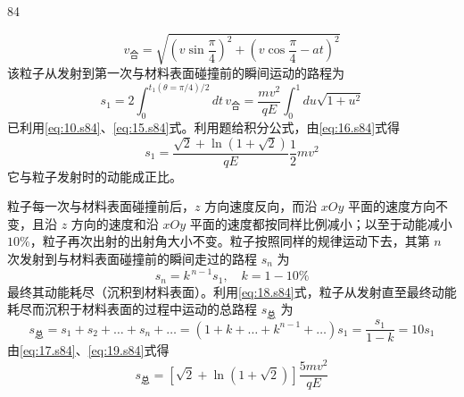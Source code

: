 \begin{solution}{84}
\begin{subsolution}
\begin{subsubsolution}
\begin{subsubsubsolution}
\begin{subsubsubsubsolution}
                    \begin{equation}
                        v_{\text{合}} = \sqrt{ (v\sin\frac{\pi}{4})^{2} + (v\cos\frac{\pi}{4} - a t)^{2} }
                        \label{eq:15.s84}
                    \end{equation}
                    该粒子从发射到第一次与材料表面碰撞前的瞬间运动的路程为
                    \begin{equation}
                        s_{1} = 2 \int_{0}^{t_{1}(\theta=\pi/4)/2} dt\, v_{\text{合}} = \frac{m v^{2}}{q E} \int_{0}^{1} du \sqrt{1+u^{2}}
                        \label{eq:16.s84}
                    \end{equation}
                    已利用\eqref{eq:10.s84}、\eqref{eq:15.s84}式。利用题给积分公式，由\eqref{eq:16.s84}式得
                    \begin{equation}
                        s_{1} = \frac{\sqrt{2} + \ln(1+\sqrt{2})}{q E} \frac{1}{2} m v^{2}
                        \label{eq:17.s84}
                    \end{equation}
                    它与粒子发射时的动能成正比。

                    粒子每一次与材料表面碰撞前后，$z$ 方向速度反向，而沿 $xOy$ 平面的速度方向不变，且沿 $z$ 方向的速度和沿 $xOy$ 平面的速度都按同样比例减小；以至于动能减小 $10\%$，粒子再次出射的出射角大小不变。粒子按照同样的规律运动下去，其第 $n$ 次发射到与材料表面碰撞前的瞬间走过的路程 $s_{n}$ 为
                    \begin{equation}
                        s_{n} = k^{\,n-1} s_{1}, \quad k = 1 - 10\%
                        \label{eq:18.s84}
                    \end{equation}
                    最终其动能耗尽（沉积到材料表面）。利用\eqref{eq:18.s84}式，粒子从发射直至最终动能耗尽而沉积于材料表面的过程中运动的总路程 $s_{\text{总}}$ 为
                    \begin{equation}
                        s_{\text{总}} = s_{1} + s_{2} + \dots + s_{n} + \dots = (1+k+\dots+k^{n-1}+\dots) s_{1} = \frac{s_{1}}{1-k} = 10 s_{1}
                        \label{eq:19.s84}
                    \end{equation}
                    由\eqref{eq:17.s84}、\eqref{eq:19.s84}式得
                    \begin{equation}
                        s_{\text{总}} = [ \sqrt{2} + \ln(1+\sqrt{2}) ] \frac{5 m v^{2}}{q E}
                        \label{eq:20.s84}
                    \end{equation}
                \end{subsubsubsubsolution}
            \end{subsubsubsolution}
        \end{subsubsolution}
    \end{subsolution}
\end{solution}